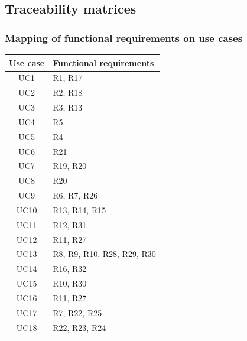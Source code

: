 \subsection{Traceability matrices}

\subsubsection*{Mapping of functional requirements on use cases}
\begin{center}
    \def\arraystretch{1.5}
    \begin{longtable}[H]{|c|l|}
        \hline
        \textbf{Use case} & \textbf{Functional requirements} \\ \hline
        UC1               & R1, R17                          \\ \hline
        UC2               & R2, R18                          \\ \hline
        UC3               & R3, R13                          \\ \hline
        UC4               & R5                               \\ \hline
        UC5               & R4                               \\ \hline
        UC6               & R21                              \\ \hline
        UC7               & R19, R20                         \\ \hline
        UC8               & R20                              \\ \hline
        UC9               & R6, R7, R26                      \\ \hline
        UC10              & R13, R14, R15                    \\ \hline
        UC11              & R12, R31                         \\ \hline
        UC12              & R11, R27                         \\ \hline
        UC13              & R8, R9, R10, R28, R29, R30       \\ \hline
        UC14              & R16, R32                         \\ \hline
        UC15              & R10, R30                         \\ \hline
        UC16              & R11, R27                         \\ \hline
        UC17              & R7, R22, R25                     \\ \hline
        UC18              & R22, R23, R24                    \\ \hline
    \end{longtable}
\end{center}

